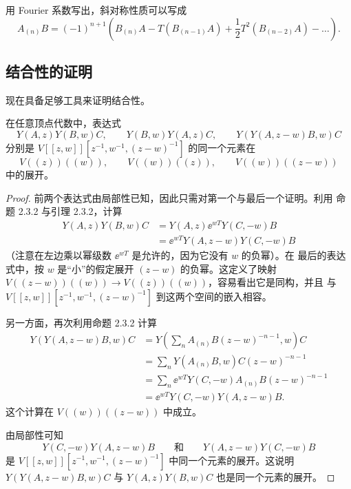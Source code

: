 用 Fourier 系数写出，斜对称性质可以写成
\[
    A_{(n)}B=(-1)^{n+1}\left(
    B_{(n)}A-T(B_{(n-1)}A)+\frac12T^2(B_{(n-2)}A)-\dots\right).
\]

\subsection{结合性的证明}

现在具备足够工具来证明结合性。

\renewcommand{\thetheorem}{2.3.3}
\begin{theorem}
    在任意顶点代数中，表达式
    \[
        Y(A,z)Y(B,w)C,\qquad
        Y(B,w)Y(A,z)C,\qquad
        Y(Y(A,z-w)B,w)C
    \]
    分别是 $V[[z,w]][z^{-1},w^{-1},(z-w)^{-1}]$ 的同一个元素在
    \[
        V(\!(z)\!)(\!(w)\!),\qquad
        V(\!(w)\!)(\!(z)\!),\qquad
        V(\!(w)\!)(\!(z-w)\!)
    \]
    中的展开。
\end{theorem}

\begin{proof}
    前两个表达式由局部性已知，因此只需对第一个与最后一个证明。利用
    命题 2.3.2 与引理 2.3.2，计算
    \[
        \begin{aligned}
            Y(A,z)Y(B,w)C
            &=Y(A,z)\ee^{wT}Y(C,-w)B\\
            &=\ee^{wT}Y(A,z-w)Y(C,-w)B
        \end{aligned}
    \]
    （注意在左边乘以幂级数 $\ee^{wT}$ 是允许的，因为它没有 $w$ 的负幂）。在
    最后的表达式中，按 $w$ 是“小”的假定展开 $(z-w)$ 的负幂。这定义了映射
    $V(\!(z-w)\!)(\!(w)\!)\to V(\!(z)\!)(\!(w)\!)$，容易看出它是同构，并且
    与 $V[[z,w]][z^{-1},w^{-1},(z-w)^{-1}]$ 到这两个空间的嵌入相容。

    另一方面，再次利用命题 2.3.2 计算
    \[
        \begin{aligned}
            Y(Y(A,z-w)B,w)C
            &=Y\left(\sum_nA_{(n)}B(z-w)^{-n-1},w\right)C\\
            &=\sum_nY(A_{(n)}B,w)C(z-w)^{-n-1}\\
            &=\sum_n\ee^{wT}Y(C,-w)A_{(n)}B(z-w)^{-n-1}\\
            &=\ee^{wT}Y(C,-w)Y(A,z-w)B.
        \end{aligned}
    \]
    这个计算在 $V(\!(w)\!)(\!(z-w)\!)$ 中成立。

    由局部性可知
    \[
        Y(C,-w)Y(A,z-w)B
        \qquad\text{和}\qquad
        Y(A,z-w)Y(C,-w)B
    \]
    是 $V[[z,w]][z^{-1},w^{-1},(z-w)^{-1}]$ 中同一个元素的展开。这说明
    $Y(Y(A,z-w)B,w)C$ 与 $Y(A,z)Y(B,w)C$ 也是同一个元素的展开。
\end{proof}


